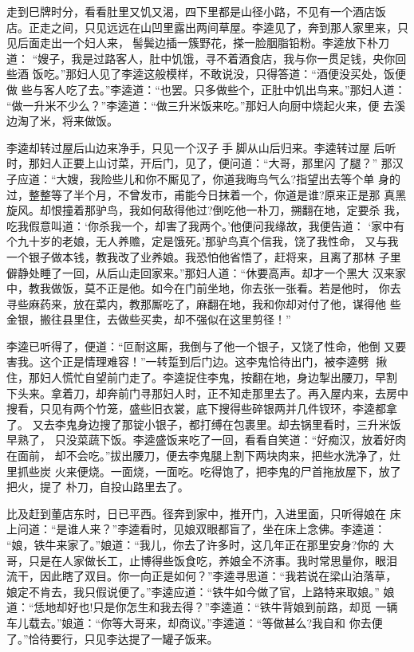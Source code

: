 走到巳牌时分，看看肚里又饥又渴，四下里都是山径小路，不见有一个酒店饭
店。正走之间，只见远远在山凹里露出两间草屋。李逵见了，奔到那人家里来，只
见后面走出一个妇人来，髻鬓边插一簇野花，搽一脸胭脂铅粉。李逵放下朴刀道：
“嫂子，我是过路客人，肚中饥饿，寻不着酒食店，我与你一贯足钱，央你回些酒
饭吃。”那妇人见了李逵这般模样，不敢说没，只得答道：“酒便没买处，饭便做
些与客人吃了去。”李逵道：“也罢。只多做些个，正肚中饥出鸟来。”那妇人道：
“做一升米不少么？”李逵道：“做三升米饭来吃。”那妇人向厨中烧起火来，便
去溪边淘了米，将来做饭。

李逵却转过屋后山边来净手，只见一个汉子手脚从山后归来。李逵转过屋
后听时，那妇人正要上山讨菜，开后门，见了，便问道：“大哥，那里闪了腿？”
那汉子应道：“大嫂，我险些儿和你不厮见了，你道我晦鸟气么?指望出去等个单
身的过，整整等了半个月，不曾发市，甫能今日抹着一个，你道是谁?原来正是那
真黑旋风。却恨撞着那驴鸟，我如何敌得他过?倒吃他一朴刀，搠翻在地，定要杀
我，吃我假意叫道：‘你杀我一个，却害了我两个。’他便问我缘故，我便告道：
‘家中有个九十岁的老娘，无人养赡，定是饿死。’那驴鸟真个信我，饶了我性命，
又与我一个银子做本钱，教我改了业养娘。我恐怕他省悟了，赶将来，且离了那林
子里僻静处睡了一回，从后山走回家来。”那妇人道：“休要高声。却才一个黑大
汉来家中，教我做饭，莫不正是他。如今在门前坐地，你去张一张看。若是他时，
你去寻些麻药来，放在菜内，教那厮吃了，麻翻在地，我和你却对付了他，谋得他
些金银，搬往县里住，去做些买卖，却不强似在这里剪径！”

李逵已听得了，便道：“叵耐这厮，我倒与了他一个银子，又饶了性命，他倒
又要害我。这个正是情理难容！”一转踅到后门边。这李鬼恰待出门，被李逵劈
揪住，那妇人慌忙自望前门走了。李逵捉住李鬼，按翻在地，身边掣出腰刀，早割
下头来。拿着刀，却奔前门寻那妇人时，正不知走那里去了。再入屋内来，去房中
搜看，只见有两个竹笼，盛些旧衣裳，底下搜得些碎银两并几件钗环，李逵都拿了。
又去李鬼身边搜了那锭小银子，都打缚在包裹里。却去锅里看时，三升米饭早熟了，
只没菜蔬下饭。李逵盛饭来吃了一回，看看自笑道：“好痴汉，放着好肉在面前，
却不会吃。”拔出腰刀，便去李鬼腿上割下两块肉来，把些水洗净了，灶里抓些炭
火来便烧。一面烧，一面吃。吃得饱了，把李鬼的尸首拖放屋下，放了把火，提了
朴刀，自投山路里去了。

比及赶到董店东时，日已平西。径奔到家中，推开门，入进里面，只听得娘在
床上问道：“是谁人来？”李逵看时，见娘双眼都盲了，坐在床上念佛。李逵道：
“娘，铁牛来家了。”娘道：“我儿，你去了许多时，这几年正在那里安身?你的
大哥，只是在人家做长工，止博得些饭食吃，养娘全不济事。我时常思量你，眼泪
流干，因此瞎了双目。你一向正是如何？”李逵寻思道：“我若说在梁山泊落草，
娘定不肯去，我只假说便了。”李逵应道：“铁牛如今做了官，上路特来取娘。”
娘道：“恁地却好也!只是你怎生和我去得？”李逵道：“铁牛背娘到前路，却觅
一辆车儿载去。”娘道：“你等大哥来，却商议。”李逵道：“等做甚么?我自和
你去便了。”恰待要行，只见李达提了一罐子饭来。

